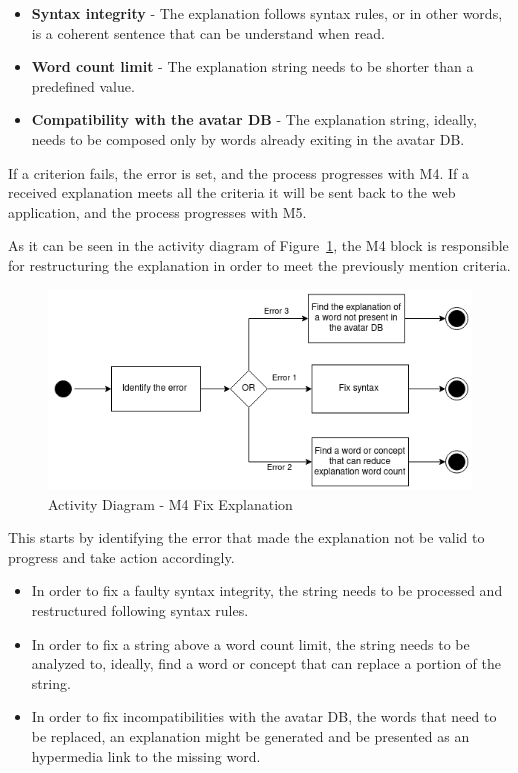 \begin{itemize}
    \item \textbf{Syntax integrity} - The explanation follows syntax rules, or in other words, is a coherent sentence that can be understand when read.
    \item \textbf{Word count limit} - The explanation string needs to be shorter than a predefined value.
    \item \textbf{Compatibility with the avatar \gls{DB}} - The explanation string, ideally, needs to be composed only by words already exiting in the avatar \gls{DB}.
\end{itemize}

If a criterion fails, the error is set, and the process progresses with M4.
If a received explanation meets all the criteria it will be sent back to the web application, and the process progresses with M5.

As it can be seen in the activity diagram of Figure~\ref{fig:M4}, the M4 block is responsible for restructuring the explanation in order to meet the previously mention criteria.

\begin{figure}[H]
\centering
\includegraphics[width=\textwidth,keepaspectratio]{ch4/assets/M4.png}
\caption[Actibity Diagram Fix Explanation Module]{Activity Diagram - M4 Fix Explanation}
\label{fig:M4}
\end{figure}

This starts by identifying the error that made the explanation not be valid to progress and take action accordingly.

\begin{itemize}
    \item In order to fix a faulty syntax integrity, the string needs to be processed and restructured following syntax rules.
    \item In order to fix a string above a word count limit, the string needs to be analyzed to, ideally, find a word or concept that can replace a portion of the string.
    \item In order to fix incompatibilities with the avatar \gls{DB}, the words that need to be replaced, an explanation might be generated and be presented as an hypermedia link to the missing word.
\end{itemize}

